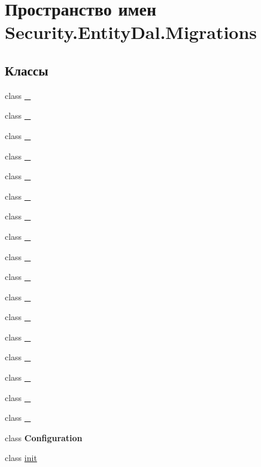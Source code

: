\hypertarget{namespace_security_1_1_entity_dal_1_1_migrations}{}\section{Пространство имен Security.\+Entity\+Dal.\+Migrations}
\label{namespace_security_1_1_entity_dal_1_1_migrations}
\subsection*{Классы}
\begin{DoxyCompactItemize}
\item 
class \hyperlink{class_security_1_1_entity_dal_1_1_migrations_1_1__1}{\+\_}
\item 
class \hyperlink{class_security_1_1_entity_dal_1_1_migrations_1_1__10}{\+\_}
\item 
class \hyperlink{class_security_1_1_entity_dal_1_1_migrations_1_1__11}{\+\_}
\item 
class \hyperlink{class_security_1_1_entity_dal_1_1_migrations_1_1__12}{\+\_}
\item 
class \hyperlink{class_security_1_1_entity_dal_1_1_migrations_1_1__13}{\+\_}
\item 
class \hyperlink{class_security_1_1_entity_dal_1_1_migrations_1_1__14}{\+\_}
\item 
class \hyperlink{class_security_1_1_entity_dal_1_1_migrations_1_1__15}{\+\_}
\item 
class \hyperlink{class_security_1_1_entity_dal_1_1_migrations_1_1__16}{\+\_}
\item 
class \hyperlink{class_security_1_1_entity_dal_1_1_migrations_1_1__17}{\+\_}
\item 
class \hyperlink{class_security_1_1_entity_dal_1_1_migrations_1_1__2}{\+\_}
\item 
class \hyperlink{class_security_1_1_entity_dal_1_1_migrations_1_1__3}{\+\_}
\item 
class \hyperlink{class_security_1_1_entity_dal_1_1_migrations_1_1__4}{\+\_}
\item 
class \hyperlink{class_security_1_1_entity_dal_1_1_migrations_1_1__5}{\+\_}
\item 
class \hyperlink{class_security_1_1_entity_dal_1_1_migrations_1_1__6}{\+\_}
\item 
class \hyperlink{class_security_1_1_entity_dal_1_1_migrations_1_1__7}{\+\_}
\item 
class \hyperlink{class_security_1_1_entity_dal_1_1_migrations_1_1__8}{\+\_}
\item 
class \hyperlink{class_security_1_1_entity_dal_1_1_migrations_1_1__9}{\+\_}
\item 
class {\bfseries Configuration}
\item 
class \hyperlink{class_security_1_1_entity_dal_1_1_migrations_1_1init}{init}
\end{DoxyCompactItemize}
